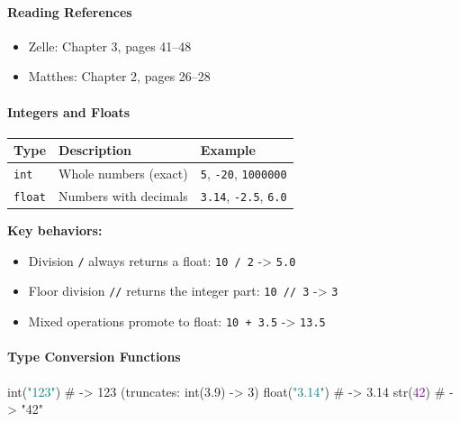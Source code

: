 \documentclass[
  justified,
  openright,
]{tufte-book}
\let\subsubsection\paragraph
\let\paragraph\paragraph
\newcommand{\BuiltInTok}[1]{#1}
\newcommand{\CommentTok}[1]{\textcolor{MidGray}{#1}}
\newcommand{\DecValTok}[1]{\textcolor{Purple}{#1}}
\newcommand{\NormalTok}[1]{#1}
\newcommand{\StringTok}[1]{\textcolor{Teal}{#1}}
\newenvironment{Shaded}{%
  \begin{snugshade}
}{%
  \end{snugshade}
}
\let\subsubsection\paragraph
\let\paragraph\paragraph
\providecommand{\tightlist}{%
  \setlength{\itemsep}{0pt}\setlength{\parskip}{0pt}}
\begin{document}
\subsubsection{Reading References}\label{reading-references-10}

\begin{itemize}
\tightlist
\item
  Zelle: Chapter 3, pages 41--48
\item
  Matthes: Chapter 2, pages 26--28
\end{itemize}

\subsubsection{Integers and Floats}\label{integers-and-floats}

{\def\LTcaptype{none} %
\begin{longtable}[]{@{}lll@{}}
\toprule\noalign{}
Type & Description & Example \\
\midrule\noalign{}
\endhead
\bottomrule\noalign{}
\endlastfoot
\texttt{int} & Whole numbers (exact) & \texttt{5}, \texttt{-20},
\texttt{1000000} \\
\texttt{float} & Numbers with decimals & \texttt{3.14}, \texttt{-2.5},
\texttt{6.0} \\
\end{longtable}
}

\textbf{Key behaviors:}

\begin{itemize}
\tightlist
\item
  Division \texttt{/} always returns a float: \texttt{10\ /\ 2}
  -\textgreater{} \texttt{5.0}
\item
  Floor division \texttt{//} returns the integer part:
  \texttt{10\ //\ 3} -\textgreater{} \texttt{3}
\item
  Mixed operations promote to float: \texttt{10\ +\ 3.5} -\textgreater{}
  \texttt{13.5}
\end{itemize}

\subsubsection{Type Conversion
Functions}\label{type-conversion-functions}

\begin{Shaded}
\begin{Highlighting}[]
\BuiltInTok{int}\NormalTok{(}\StringTok{"123"}\NormalTok{)      }\CommentTok{\# {-}\textgreater{} 123  (truncates: int(3.9) {-}\textgreater{} 3)}
\BuiltInTok{float}\NormalTok{(}\StringTok{"3.14"}\NormalTok{)   }\CommentTok{\# {-}\textgreater{} 3.14}
\BuiltInTok{str}\NormalTok{(}\DecValTok{42}\NormalTok{)         }\CommentTok{\# {-}\textgreater{} "42"}
\end{Highlighting}
\end{Shaded}
\end{document}
